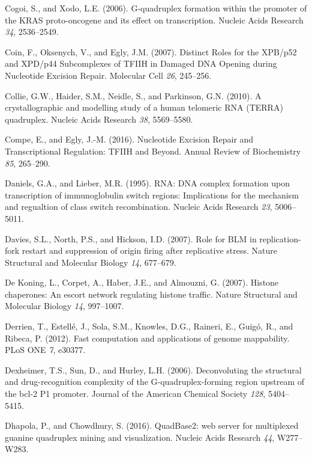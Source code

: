 \documentclass[12pt,a4paper,]{report}
\begin{document}
\leavevmode\hypertarget{ref-Cogoi2006}{}%
Cogoi, S., and Xodo, L.E. (2006). G-quadruplex formation within the
promoter of the KRAS proto-oncogene and its effect on transcription.
Nucleic Acids Research \emph{34}, 2536--2549.

\leavevmode\hypertarget{ref-Coin2007}{}%
Coin, F., Oksenych, V., and Egly, J.M. (2007). Distinct Roles for the
XPB/p52 and XPD/p44 Subcomplexes of TFIIH in Damaged DNA Opening during
Nucleotide Excision Repair. Molecular Cell \emph{26}, 245--256.

\leavevmode\hypertarget{ref-Collie2010}{}%
Collie, G.W., Haider, S.M., Neidle, S., and Parkinson, G.N. (2010). A
crystallographic and modelling study of a human telomeric RNA (TERRA)
quadruplex. Nucleic Acids Research \emph{38}, 5569--5580.

\leavevmode\hypertarget{ref-Compe2016}{}%
Compe, E., and Egly, J.-M. (2016). Nucleotide Excision Repair and
Transcriptional Regulation: TFIIH and Beyond. Annual Review of
Biochemistry \emph{85}, 265--290.

\leavevmode\hypertarget{ref-Daniels1995}{}%
Daniels, G.A., and Lieber, M.R. (1995). RNA: DNA complex formation upon
transcription of immunoglobulin switch regions: Implications for the
mechanism and regualtion of class switch recombination. Nucleic Acids
Research \emph{23}, 5006--5011.

\leavevmode\hypertarget{ref-Davies2007}{}%
Davies, S.L., North, P.S., and Hickson, I.D. (2007). Role for BLM in
replication-fork restart and suppression of origin firing after
replicative stress. Nature Structural and Molecular Biology \emph{14},
677--679.

\leavevmode\hypertarget{ref-DeKoning2007}{}%
De Koning, L., Corpet, A., Haber, J.E., and Almouzni, G. (2007). Histone
chaperones: An escort network regulating histone traffic. Nature
Structural and Molecular Biology \emph{14}, 997--1007.

\leavevmode\hypertarget{ref-Derrien2012}{}%
Derrien, T., Estellé, J., Sola, S.M., Knowles, D.G., Raineri, E., Guigó,
R., and Ribeca, P. (2012). Fast computation and applications of genome
mappability. PLoS ONE \emph{7}, e30377.

\leavevmode\hypertarget{ref-Dexheimer2006}{}%
Dexheimer, T.S., Sun, D., and Hurley, L.H. (2006). Deconvoluting the
structural and drug-recognition complexity of the G-quadruplex-forming
region upstream of the bcl-2 P1 promoter. Journal of the American
Chemical Society \emph{128}, 5404--5415.

\leavevmode\hypertarget{ref-Dhapola2016}{}%
Dhapola, P., and Chowdhury, S. (2016). QuadBase2: web server for
multiplexed guanine quadruplex mining and visualization. Nucleic Acids
Research \emph{44}, W277--W283.
\end{document}
